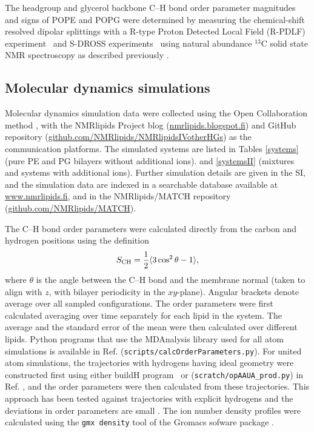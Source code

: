 \documentclass[aps,prl,superscriptaddress,twocolumn]{revtex4}
\begin{document}
The headgroup and glycerol backbone C--H bond order parameter magnitudes and signs of POPE and POPG
were determined by measuring the chemical-shift resolved dipolar splittings
with a R-type Proton Detected Local Field (R-PDLF) experiment~\cite{dvinskikh04} and
S-DROSS experiments~\cite{gross97} using natural abundance $^{13}$C solid state NMR spectroscopy
as described previously \cite{ferreira13,ferreira16,NMRlipidsIVps}.

\subsection{Molecular dynamics simulations}

Molecular dynamics simulation data were collected using
the Open Collaboration method \cite{botan15}, with
the NMR\-lipids Project blog (\url{nmrlipids.blogspot.fi}) and
GitHub repository (\url{github.com/NMRlipids/NMRlipidsIVotherHGs})
as the communication platforms.
The simulated systems are listed in 
Tables \ref{systems} (pure PE and PG bilayers without additional ions).
and \ref{systemsII} (mixtures and systems with additional ions).
Further simulation details are given in the SI, and
the simulation data are indexed in a
searchable database available at \url{www.nmrlipids.fi},
and in the NMRlipids/MATCH repository (\url{github.com/NMRlipids/MATCH}).

The C--H bond order parameters were calculated directly
from the carbon and hydrogen positions using the definition
\begin{equation}
S_{\rm CH}=\frac{1}{2}\langle 3\cos^2\theta -1 \rangle,
\end{equation}
where $\theta$ is the angle between the C--H bond and the membrane normal
(taken to align with $z$, with bilayer periodicity in the $xy$-plane).
Angular brackets denote average over all sampled configurations.
The order parameters were first calculated averaging over time separately
for each lipid in the system. The average and
the standard error of the mean were then calculated over different lipids.
Python programs that use the MDAnalysis library \cite{agrawal11,gowers16}
used for all atom simulations is available in Ref. 
({\tt scripts/calcOrderParameters.py}). For united atom simulations, the trajectories
with hydrogens having ideal geometry were constructed first using either buildH program~\cite{buildH}
or ({\tt scratch/opAAUA\_prod.py}) in  Ref. , and the order parameters were
then calculated from these trajectories. This approach has been tested against trajectories
with explicit hydrogens and the deviations in order parameters are small \cite{buildH,piggot18}.
The ion number density profiles were calculated using the {\tt gmx density} tool
of the Gromacs sofware package \cite{gromacsMANUAL}.
\end{document}
